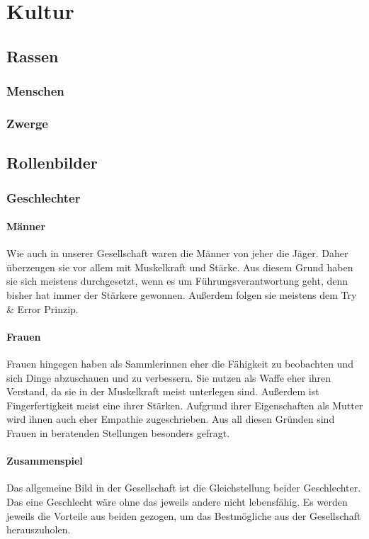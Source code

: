\chapter{Kultur}
\section{Rassen}
\subsection{Menschen}
\subsection{Zwerge}

\section{Rollenbilder}
\subsection{Geschlechter}
\subsubsection{Männer} 
Wie auch in unserer Gesellschaft waren die Männer von jeher die Jäger. Daher überzeugen sie vor allem mit Muskelkraft und Stärke. 
Aus diesem Grund haben sie sich meistens durchgesetzt, wenn es um Führungsverantwortung geht, denn bisher hat immer der Stärkere gewonnen. 
Außerdem folgen sie meistens dem Try \& Error Prinzip.
	
\subsubsection{Frauen} 
Frauen hingegen haben als Sammlerinnen eher die Fähigkeit zu beobachten und sich Dinge abzuschauen und zu verbessern. 
Sie nutzen als Waffe eher ihren Verstand, da sie in der Muskelkraft meist unterlegen sind. 
Außerdem ist Fingerfertigkeit meist eine ihrer Stärken.
Aufgrund ihrer Eigenschaften als Mutter wird ihnen auch eher Empathie zugeschrieben. 
Aus all diesen Gründen sind Frauen in beratenden Stellungen besonders gefragt.
	
\subsubsection{Zusammenspiel}
Das allgemeine Bild in der Gesellschaft ist die Gleichstellung beider Geschlechter. 
Das eine Geschlecht wäre ohne das jeweils andere nicht lebensfähig. 
Es werden jeweils die Vorteile aus beiden gezogen, um das Bestmögliche aus der Gesellschaft herauszuholen.

